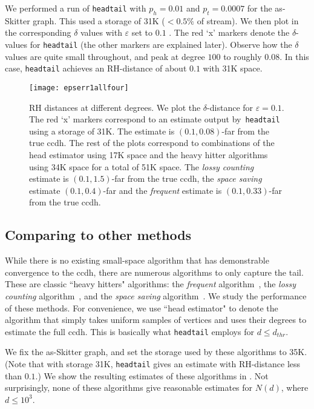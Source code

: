 \documentclass[11pt]{article}
\theoremstyle{definition}
\def\eps{\varepsilon}
\newcommand{\degdist}{{\tt headtail}}
\begin{document}
We performed a run of \degdist{} with $p_h = 0.01$ and $p_t=0.0007$ for the as-Skitter
graph. This used a storage of 31K ($< 0.5\%$ of stream). We then plot in 
the corresponding $\delta$ values with $\eps$ set to $0.1$ .
The red `\textsf{x}' markers denote the $\delta$-values for \degdist{} (the
other markers are explained later). Observe how the $\delta$ values
are quite small throughout, and peak at degree $100$ to roughly $0.08$.
In this case, \degdist{} achieves an RH-distance of about $0.1$ with 31K space.

\begin{figure}
\centering \texttt{[image: epserr1allfour]}
\captionsetup{width=0.9\textwidth}
\caption{RH distances at different degrees.  We plot the $\delta$-distance for
$\eps=0.1$.  The red `\textsf{x}' markers correspond to an estimate output
by~\degdist{} using a storage of 31K.  The estimate is $(0.1, 0.08)$-far from
the true ccdh.  The rest of the plots correspond to combinations of the head
estimator using 17K space and the heavy hitter algorithms using 34K space for a
total of 51K space.  The \emph{lossy counting} estimate is $(0.1, 1.5)$-far from
the true ccdh, the \emph{space saving} estimate $(0.1, 0.4)$-far and the
\emph{frequent} estimate is $(0.1, 0.33)$-far from the true ccdh.}
\label{fig:allscales}
\end{figure}



\subsection{Comparing to other methods}\label{sec:compare}

While there is no existing small-space algorithm that has demonstrable convergence
to the ccdh, there are numerous algorithms to only capture the tail.
These are classic ``heavy hitters" algorithms: the \emph{frequent} algorithm~\cite{demaine2002frequency,
  karp2003simple,BerindeICS10}, the \emph{lossy counting}
algorithm~\cite{manku2002approximate}, and the \emph{space saving}
algorithm~\cite{metwally2005efficient}. We study the performance of these methods.
For convenience, we use ``head estimator" to denote the algorithm that simply
takes uniform samples of vertices and uses their degrees to estimate the full ccdh.
This is basically what \degdist{} employs for $d \leq d_{thr}$.


We fix the as-Skitter graph, and set the storage used by these algorithms to 35K. (Note that with storage 31K, \degdist{} gives an estimate
with RH-distance less than $0.1$.) We show the resulting estimates of these algorithms
in . Not surprisingly, none of these algorithms give reasonable estimates
for $N(d)$, where $d \leq 10^3$.
\end{document}

